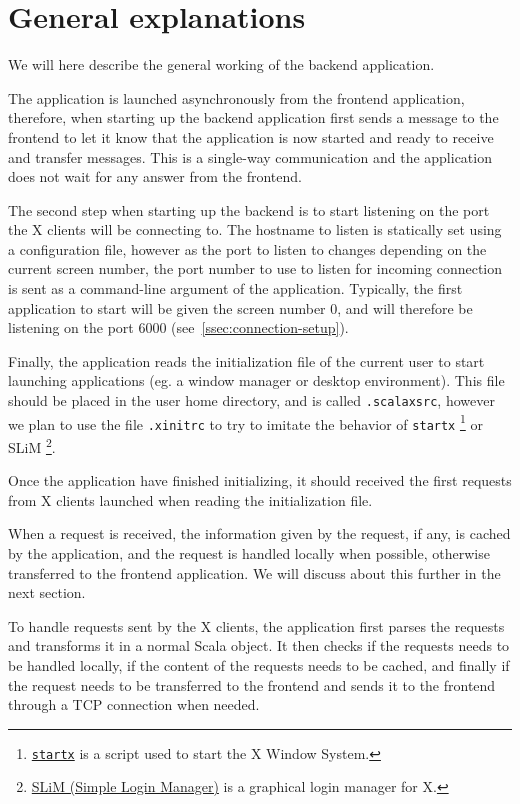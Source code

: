 \section{General explanations}
%
We will here describe the general working of the backend application. %

The application is launched asynchronously from the frontend application, 
therefore, when starting up the backend application first sends a message to 
the frontend to let it know that the application is now started and ready to 
receive and transfer messages. This is a single-way communication and the 
application does not wait for any answer from the frontend.

The second step when starting up the backend is to start listening on the 
port the X clients will be connecting to. The hostname 
to listen is statically set using a configuration file, however as the port 
to listen to changes depending on the current screen number, the port number to 
use to listen for incoming connection is sent as a command-line argument of the 
application. Typically, the first application to start will be given the 
screen number $0$, and will therefore be listening on the port $6000$ 
(see~\ref{ssec:connection-setup}).

Finally, the application reads the initialization file of the current user 
to start launching applications (eg. a window manager or desktop environment). 
This file should be placed in the user home directory, and is called 
\lstinline{.scalaxsrc}, however we plan to use the file \lstinline{.xinitrc} to 
try to imitate the behavior of \lstinline{startx}
\footnote{\href{http://linux.die.net/man/1/startx}{\lstinline{startx}} is a script used to start the X Window System.}
or SLiM
\footnote{\href{http://slim.berlios.de/}{SLiM (Simple Login Manager)} is a graphical login manager for X.}.

Once the application have finished initializing, it should received the first requests 
from X clients launched when reading the initialization file.

When a request is received, the information given by the request, if any, is cached 
by the application, and the request is handled locally when possible, otherwise 
transferred to the frontend application. We will discuss about this further in the next 
section.

To handle requests sent by the X clients, the application first parses the requests and 
transforms it in a normal Scala object. It then checks if the requests needs to be handled 
locally, if the content of the requests needs to be cached, and finally if the request 
needs to be transferred to the frontend and sends it to the frontend through a TCP connection 
when needed.

